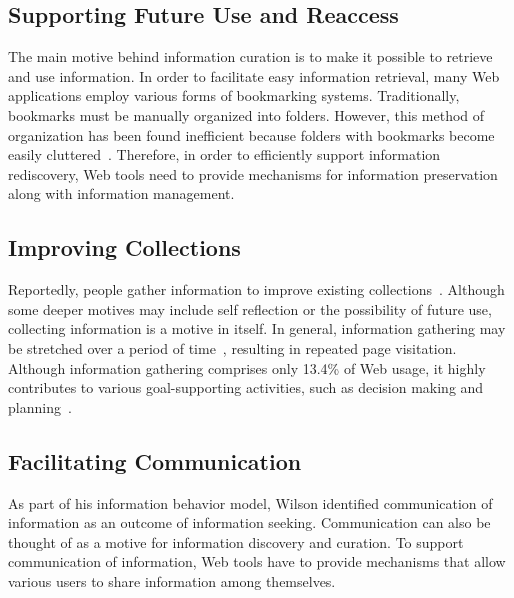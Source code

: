 {{\subsection{Supporting Future Use and Reaccess}
The main motive behind information curation is to make it possible to retrieve and use information. In order to facilitate easy information retrieval, many Web applications employ various forms of bookmarking systems. Traditionally, bookmarks must be manually organized into folders. However, this method of organization has been found inefficient because folders with bookmarks become easily cluttered~\cite{abrams1998information}. Therefore, in order to efficiently support information rediscovery, Web tools need to provide mechanisms for information preservation along with information management.
}

{\subsection{Improving Collections}
Reportedly, people gather information to improve existing collections~\cite{lindley2012s}. Although some deeper motives may include self reflection or the possibility of future use, collecting information is a motive in itself. In general, information gathering may be stretched over a period of time~\cite{kellar2006goal}, resulting in repeated page visitation. Although information gathering comprises only 13.4\% of Web usage, it highly contributes to various goal-supporting activities, such as decision making and planning~\cite{kellar2006goal}.

}

{\subsection{Facilitating Communication}
As part of his information behavior model, Wilson identified communication of information as an outcome of information seeking. Communication can also be thought of as a motive for information discovery and curation. To support communication of information, Web tools have to provide mechanisms that allow various users to share information among themselves. 

}}

